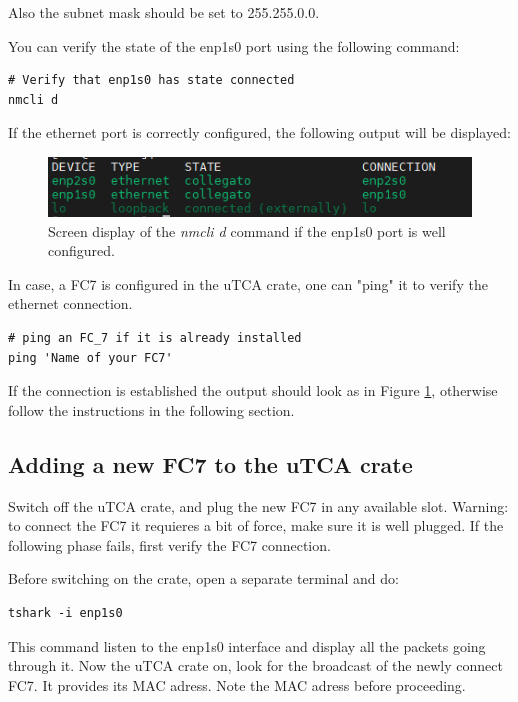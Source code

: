 \documentclass[10pt,a4paper]{article}
\begin{document}
Also the subnet mask should be set to 255.255.0.0.

You can verify the state of the enp1s0 port using the following command:
\begin{framed}
\begin{verbatim}
# Verify that enp1s0 has state connected
nmcli d  
\end{verbatim}
\end{framed}
If the ethernet port is correctly configured, the following output will be displayed:
\begin{figure}[h!]
\centering
 \includegraphics[width=0.6\linewidth]{Nmcli_output.png} 
  \caption{Screen display of the \emph{nmcli d} command if the enp1s0 port is well configured.}
  \label{GoodPing}
\end{figure}

In case, a FC7 is configured in the uTCA crate, one can "ping" it to verify the ethernet connection.
\begin{framed}
\begin{verbatim}
# ping an FC_7 if it is already installed
ping 'Name of your FC7'  
\end{verbatim}
\end{framed}
If the connection is established the output should look as in Figure \ref{GoodPing}, otherwise follow the instructions in the following section.


\subsection{Adding a new FC7 to the uTCA crate}
Switch off the uTCA crate, and plug the new FC7 in any available slot. Warning: to connect the FC7 it requieres a bit of force, make sure it is well plugged. If the following phase fails, first verify the FC7 connection.

Before switching on the crate, open a separate terminal and do:

\begin{framed}
\begin{verbatim}
tshark -i enp1s0  
\end{verbatim}
\end{framed}

This command listen to the enp1s0 interface and display all the packets going through it.
Now the uTCA crate on,  look for the broadcast of the newly connect FC7. It provides its MAC  adress. Note the MAC adress before proceeding.
\end{document}
